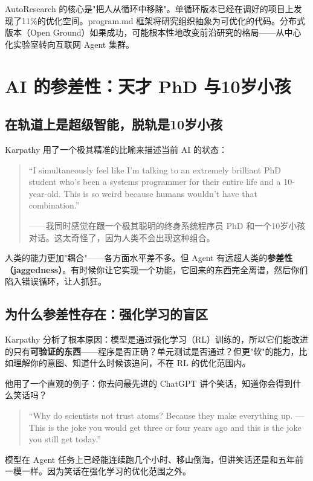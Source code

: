 \documentclass[a4paper]{article}
\begin{document}
AutoResearch 的核心是"把人从循环中移除"。单循环版本已经在调好的项目上发现了11\%的优化空间。program.md 框架将研究组织抽象为可优化的代码。分布式版本（Open Ground）如果成功，可能根本性地改变前沿研究的格局——从中心化实验室转向互联网 Agent 集群。


\section{AI 的参差性：天才 PhD 与10岁小孩}

\subsection{在轨道上是超级智能，脱轨是10岁小孩}

Karpathy 用了一个极其精准的比喻来描述当前 AI 的状态：

\begin{quote}
``I simultaneously feel like I'm talking to an extremely brilliant PhD student who's been a systems programmer for their entire life and a 10-year-old. This is so weird because humans wouldn't have that combination.''

——我同时感觉在跟一个极其聪明的终身系统程序员 PhD 和一个10岁小孩对话。这太奇怪了，因为人类不会出现这种组合。
\end{quote}

人类的能力更加"耦合"——各方面水平差不多。但 Agent 有远超人类的\textbf{参差性（jaggedness）}。有时候你让它实现一个功能，它回来的东西完全离谱，然后你们陷入错误循环，让人抓狂。

\subsection{为什么参差性存在：强化学习的盲区}

Karpathy 分析了根本原因：模型是通过强化学习（RL）训练的，所以它们能改进的只有\textbf{可验证的东西}——程序是否正确？单元测试是否通过？但更"软"的能力，比如理解你的意图、知道什么时候该追问，不在 RL 的优化范围内。

他用了一个直观的例子：你去问最先进的 ChatGPT 讲个笑话，知道你会得到什么笑话吗？

\begin{quote}
``Why do scientists not trust atoms? Because they make everything up. — This is the joke you would get three or four years ago and this is the joke you still get today.''
\end{quote}

模型在 Agent 任务上已经能连续跑几个小时、移山倒海，但讲笑话还是和五年前一模一样。因为笑话在强化学习的优化范围之外。
\end{document}
